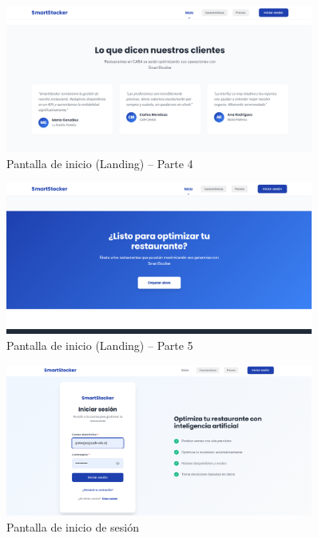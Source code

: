 \begin{figure}[htbp]
    \centering
    \includegraphics[width=0.9\textwidth]{images/landing4.png}
    \caption{Pantalla de inicio (Landing) – Parte 4}
    \label{fig:ux-landing4}
\end{figure}

\begin{figure}[htbp]
    \centering
    \includegraphics[width=0.9\textwidth]{images/landing5.png}
    \caption{Pantalla de inicio (Landing) – Parte 5}
    \label{fig:ux-landing5}
\end{figure}

\begin{figure}[htbp]
    \centering
    \includegraphics[width=0.9\textwidth]{images/login.png}
    \caption{Pantalla de inicio de sesión}
    \label{fig:ux-login}
\end{figure}

